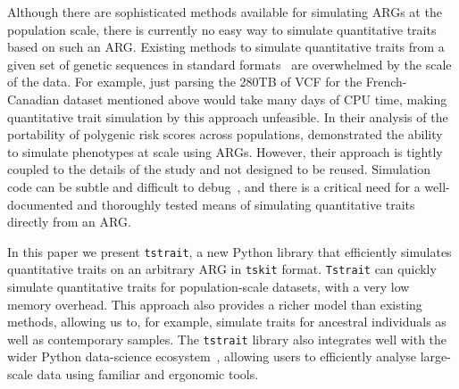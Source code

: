 \documentclass[unnumsec,webpdf,modern,large,namedate]{oup-authoring-template}%
\begin{document}
Although there are sophisticated methods available for simulating
ARGs at the population scale, there is currently no
easy way to simulate quantitative traits based on such an ARG.
Existing methods to simulate quantitative traits from a given set of
genetic sequences in standard formats~\citep[e.g.][]{meyer2018,fernandes2020}
are overwhelmed by the scale of the data. For example,
just parsing the 280TB of VCF for the French-Canadian
dataset mentioned above would take many days of CPU time,
making quantitative trait simulation by this approach unfeasible.
In their analysis of the portability of polygenic risk
scores across populations, \citet{martin2017}
demonstrated the ability to simulate phenotypes at scale using ARGs.
However, their approach is tightly coupled to the details
of the study
and not designed to be reused.
Simulation code can be subtle and difficult to
debug~\citep{ragsdale2020lessons}, and there
is a critical need for a well-documented and
thoroughly tested means of simulating quantitative
traits directly from an ARG.

In this paper we present \texttt{tstrait}, a new Python library that
efficiently simulates quantitative traits on an arbitrary ARG
in \texttt{tskit} format.
\texttt{Tstrait} can
quickly simulate quantitative traits for population-scale datasets,
with a very low memory overhead. This approach also provides a
richer model than existing methods,
allowing us to, for example, simulate traits for
ancestral individuals as well as contemporary samples.
The \texttt{tstrait} library also integrates well with the wider
Python data-science ecosystem~\citep{numpy},
allowing users to efficiently analyse
large-scale data using familiar and ergonomic tools.
\end{document}
